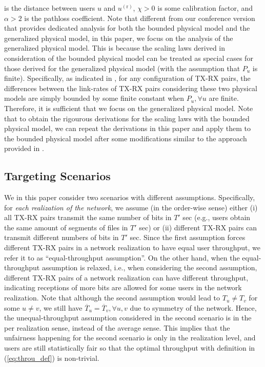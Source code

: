 \documentclass[journal,draftclsnofoot,onecolumn,12pt,twoside]{IEEEtran}
\begin{document}
is the distance between users $u$ and $u^{(\text{r})}$, $\chi>0$ is some calibration factor, and $\alpha> 2$ is the pathloss coefficient. Note that different from our conference version that provides dedicated analysis for both the bounded physical model and the generalized physical model, in this paper, we focus on the analysis of the generalized physical model. This is because the scaling laws derived in consideration of the bounded physical model can be treated as special cases for those derived for the generalized physical model (with the assumption that $P_u$ is finite). Specifically, as indicated in \cite{agarwal2004capacity,xue2006scaling}, for any configuration of TX-RX pairs, the differences between the link-rates of TX-RX pairs considering these two physical models are simply bounded by some finite constant when $P_u,\forall u$ are finite. Therefore, it is sufficient that we focus on the generalized physical model. Note that to obtain the rigourous derivations for the scaling laws with the bounded physical model, we can repeat the derivations in this paper and apply them to the bounded physical model after some modifications similar to the approach provided in \cite{lee2021throughput}.

\subsection{Targeting Scenarios}

We in this paper consider two scenarios with different assumptions. Specifically, for {\em each realization of the network}, we assume (in the order-wise sense) either (i) all TX-RX pairs transmit the same number of bits in $T'$ sec (e.g., users obtain the same amount of segments of files in $T'$ sec) or (ii) different TX-RX pairs can transmit different numbers of bits in $T'$ sec. Since the first assumption forces different TX-RX pairs in a network realization to have equal user throughput, we refer it to as ``equal-throughput assumption''. On the other hand, when the equal-throughput assumption is relaxed, i.e., when considering the second assumption, different TX-RX pairs of a network realization can have different throughput, indicating receptions of more bits are allowed for some users in the network realization. Note that although the second assumption would lead to $T_u\neq T_v$ for some $u\neq v$, we still have $\overline{T}_{u}=\overline{T}_{v},\forall u,v$ due to symmetry of the network. Hence, the unequal-throughput assumption considered in the second scenario is in the per realization sense, instead of the average sense. This implies that the unfairness happening for the second scenario is only in the realization level, and users are still statistically fair so that the optimal throughput with definition in (\ref{eq:throu_def}) is non-trivial.
\end{document}

